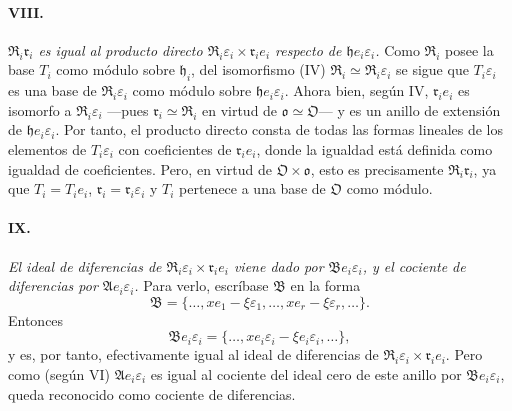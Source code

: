 \paragraph{VIII.}
\emph{$\mathfrak R_i\mathfrak r_i$ es igual al producto directo $\mathfrak R_i\varepsilon_i\times\mathfrak r_i e_i$ respecto de $\mathfrak h e_i\varepsilon_i$.} Como $\mathfrak R_i$ posee la base $T_i$ como módulo sobre $\mathfrak h_i$, del isomorfismo (IV) $\mathfrak R_i\simeq\mathfrak R_i\varepsilon_i$ se sigue que $T_i\varepsilon_i$ es una base de $\mathfrak R_i\varepsilon_i$ como módulo sobre $\mathfrak h e_i\varepsilon_i$. Ahora bien, según IV, $\mathfrak r_i e_i$ es isomorfo a $\mathfrak R_i\varepsilon_i$ ---pues $\mathfrak r_i\simeq\mathfrak R_i$ en virtud de $\mathfrak o\simeq\mathfrak O$--- y es un anillo de extensión de $\mathfrak h e_i\varepsilon_i$. Por tanto, el producto directo consta de todas las formas lineales de los elementos de $T_i\varepsilon_i$ con coeficientes de $\mathfrak r_i e_i$, donde la igualdad está definida como igualdad de coeficientes. Pero, en virtud de $\mathfrak O\times\mathfrak o$, esto es precisamente $\mathfrak R_i\mathfrak r_i$, ya que $T_i=T_i e_i$, $\mathfrak r_i=\mathfrak r_i\varepsilon_i$ y $T_i$ pertenece a una base de $\mathfrak O$ como módulo.

\paragraph{IX.}
\emph{El ideal de diferencias de $\mathfrak R_i\varepsilon_i\times\mathfrak r_i e_i$ viene dado por $\mathfrak B e_i\varepsilon_i$, y el cociente de diferencias por $\mathfrak A e_i\varepsilon_i$.} Para verlo, escríbase $\mathfrak B$ en la forma
\[
\mathfrak B=\{\ldots,xe_1-\xi\varepsilon_1,\ldots,xe_r-\xi\varepsilon_r,\ldots\}.
\]
Entonces
\[
\mathfrak B e_i\varepsilon_i
=\{\ldots,xe_i\varepsilon_i-\xi e_i\varepsilon_i,\ldots\},
\]
y es, por tanto, efectivamente igual al ideal de diferencias de $\mathfrak R_i\varepsilon_i\times\mathfrak r_i e_i$. Pero como (según VI) $\mathfrak A e_i\varepsilon_i$ es igual al cociente del ideal cero de este anillo por $\mathfrak B e_i\varepsilon_i$, queda reconocido como cociente de diferencias.

